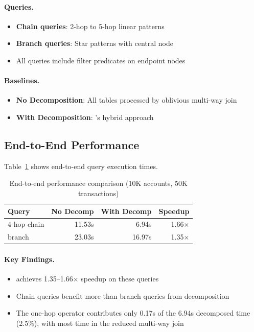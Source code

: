 \paragraph{Queries.}
\begin{itemize}
    \item \textbf{Chain queries}: 2-hop to 5-hop linear patterns
    \item \textbf{Branch queries}: Star patterns with central node
    \item All queries include filter predicates on endpoint nodes
\end{itemize}

\paragraph{Baselines.}
\begin{itemize}
    \item \textbf{No Decomposition}: All tables processed by oblivious multi-way join
    \item \textbf{With Decomposition}: \system's hybrid approach
\end{itemize}

\subsection{End-to-End Performance}
\label{sec:evaluation:e2e}

Table~\ref{tab:e2e} shows end-to-end query execution times.

\begin{table}[t]
\centering
\caption{End-to-end performance comparison (10K accounts, 50K transactions)}
\label{tab:e2e}
\begin{tabular}{lrrr}
\toprule
\textbf{Query} & \textbf{No Decomp} & \textbf{With Decomp} & \textbf{Speedup} \\
\midrule
4-hop chain & 11.53s & 6.94s & 1.66$\times$ \\
branch & 23.03s & 16.97s & 1.35$\times$ \\
\bottomrule
\end{tabular}
\end{table}

\paragraph{Key Findings.}
\begin{itemize}
    \item \system achieves 1.35--1.66$\times$ speedup on these queries
    \item Chain queries benefit more than branch queries from decomposition
    \item The one-hop operator contributes only 0.17s of the 6.94s decomposed time (2.5\%), with most time in the reduced multi-way join
\end{itemize}


